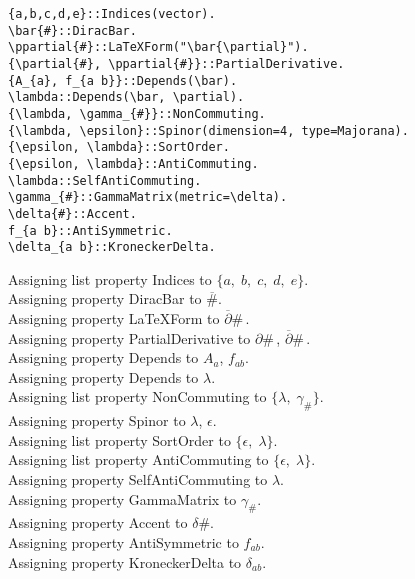 \documentclass[11pt]{article}
\renewcommand{\bar}[1]{\overline{#1}}
\begin{document}
{\color[named]{Blue}\begin{verbatim}
{a,b,c,d,e}::Indices(vector).
\bar{#}::DiracBar.
\ppartial{#}::LaTeXForm("\bar{\partial}").
{\partial{#}, \ppartial{#}}::PartialDerivative.
{A_{a}, f_{a b}}::Depends(\bar).
\lambda::Depends(\bar, \partial).
{\lambda, \gamma_{#}}::NonCommuting.
{\lambda, \epsilon}::Spinor(dimension=4, type=Majorana).
{\epsilon, \lambda}::SortOrder.
{\epsilon, \lambda}::AntiCommuting.
\lambda::SelfAntiCommuting.
\gamma_{#}::GammaMatrix(metric=\delta).
\delta{#}::Accent.
f_{a b}::AntiSymmetric.
\delta_{a b}::KroneckerDelta.
\end{verbatim}}
Assigning list property Indices to $\{a,\; b,\; c,\; d,\; e\}$.
\\
Assigning property DiracBar to $\bar{\#}$.
\\
Assigning property LaTeXForm to $\bar{\partial}{\#}\, $.
\\
Assigning property PartialDerivative to $\partial{\#}\, $, $\bar{\partial}{\#}\, $.
\\
Assigning property Depends to ${A}_{a}$, ${f}_{a b}$.
\\
Assigning property Depends to $\lambda$.
\\
Assigning list property NonCommuting to $\{\lambda,\; {\gamma}_{\#}\}$.
\\
Assigning property Spinor to $\lambda$, $\epsilon$.
\\
Assigning list property SortOrder to $\{\epsilon,\; \lambda\}$.
\\
Assigning list property AntiCommuting to $\{\epsilon,\; \lambda\}$.
\\
Assigning property SelfAntiCommuting to $\lambda$.
\\
Assigning property GammaMatrix to ${\gamma}_{\#}$.
\\
Assigning property Accent to $\delta{\#}$.
\\
Assigning property AntiSymmetric to ${f}_{a b}$.
\\
Assigning property KroneckerDelta to $\delta_{a b}$.
\end{document}
